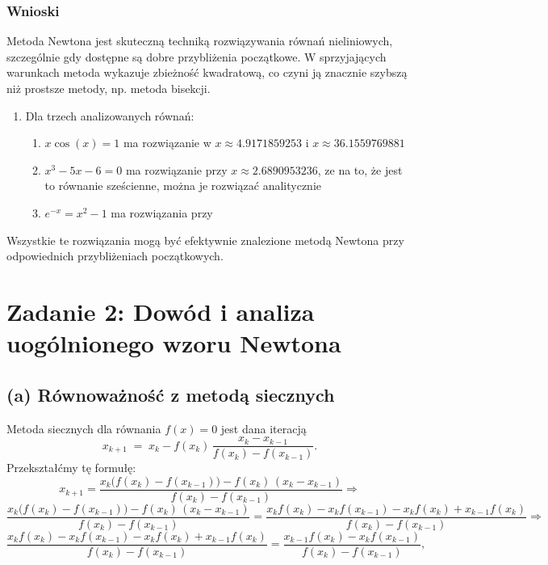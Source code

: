 \documentclass[a4paper,12pt]{article}
\begin{document}
    \subsubsection{Wnioski}
    
    Metoda Newtona jest skuteczną techniką rozwiązywania równań nieliniowych, szczególnie gdy dostępne są dobre przybliżenia początkowe. W sprzyjających warunkach metoda wykazuje zbieżność kwadratową, co czyni ją znacznie szybszą niż prostsze metody, np. metoda bisekcji.
    
    \begin{enumerate}
    \item Dla trzech analizowanych równań:
    \begin{enumerate}
        \item $x \cos(x) = 1$ ma rozwiązanie w $x \approx 4.9171859253$ i  $x \approx 36.1559769881$ 
        \item $x^3 - 5x - 6 = 0$ ma rozwiązanie przy $x \approx 2.6890953236 $, ze na to, że jest to równanie sześcienne, można je rozwiązać analitycznie \cite{wiki:Cubic_equation} 
        \item $e^{-x} = x^2 - 1$ ma rozwiązania przy 
    \end{enumerate}
    \end{enumerate}
    
    Wszystkie te rozwiązania mogą być efektywnie znalezione metodą Newtona przy odpowiednich przybliżeniach początkowych.
    
    \section*{Zadanie 2: Dowód i analiza uogólnionego wzoru Newtona}
    
    \subsection*{(a) Równoważność z metodą siecznych}
    
    Metoda siecznych dla równania \(f(x)=0\) jest dana iteracją
    \[
    x_{k+1}
    \;=\;
    x_k - f(x_k)\,\frac{x_k - x_{k-1}}{f(x_k)-f(x_{k-1})}.
    \]
    Przekształćmy tę formułę:
    \[
    x_{k+1}
    =
    \frac{x_k\bigl(f(x_k)-f(x_{k-1})\bigr)
          -f(x_k)\,(x_k-x_{k-1})}
         {f(x_k)-f(x_{k-1})} \Rightarrow
    \]
    \[
    \frac{x_k\bigl(f(x_k)-f(x_{k-1})\bigr)
          -f(x_k)\,(x_k-x_{k-1})}
         {f(x_k)-f(x_{k-1})}
    =
    \frac{x_kf(x_k)-x_kf(x_{k-1})-x_kf(x_k)+x_{k-1}f(x_k)}
         {f(x_k)-f(x_{k-1})} \Rightarrow
    \]
    \[
    \frac{x_kf(x_k)-x_kf(x_{k-1})-x_kf(x_k)+x_{k-1}f(x_k)}
         {f(x_k)-f(x_{k-1})}
    =
    \frac{x_{k-1}f(x_k)-x_kf(x_{k-1})}{f(x_k)-f(x_{k-1})},
    \]
    
\end{document}
